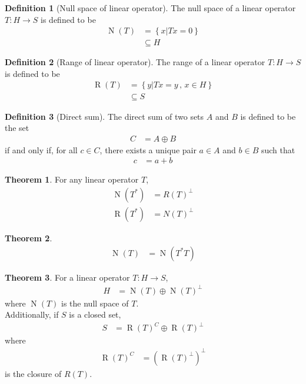 \documentclass[titlepage, fleqn, a4paper, 12pt, twoside]{article}
\theoremstyle{definition}
\newtheorem{definition}{Definition}
\theoremstyle{theorem}
\newtheorem{theorem}{Theorem}
\DeclareMathOperator{\nullspace}{\mathrm{N}}
\DeclareMathOperator{\range}{\mathrm{R}}
\begin{document}
\begin{definition}[Null space of linear operator]
	The null space of a linear operator $T : H \to S$ is defined to be
	\begin{align*}
		\nullspace(T) &= \left\{ x \Big| T x = 0 \right\}\\
		&\subseteq H
	\end{align*}
\end{definition}

\begin{definition}[Range of linear operator]
	The range of a linear operator $T : H \to S$ is defined to be
	\begin{align*}
		\range(T) &= \left\{ y \Big| T x = y \, , \, x \in H \right\}\\
		&\subseteq S
	\end{align*}
\end{definition}

\begin{definition}[Direct sum]
	The direct sum of two sets $A$ and $B$ is defined to be the set
	\begin{align*}
		C &= A \oplus B
	\end{align*}
	if and only if, for all $c \in C$, there exists a unique pair $a \in A$ and $b \in B$ such that
	\begin{align*}
		c &= a + b
	\end{align*}
\end{definition}

\begin{theorem}
	For any linear operator $T$,
	\begin{align*}
		\nullspace\left( T^* \right) &= {R(T)}^{\perp}\\
		\range\left( T^* \right) &= {N(T)}^{\perp}
	\end{align*}
	\label{thm:range_and_nullspace_of_conjugate_transpose_of_transformation}
\end{theorem}

\begin{theorem}
	\begin{align*}
		\nullspace(T) &= \nullspace\left( T^* T \right)
	\end{align*}
\end{theorem}

\begin{theorem}
	For a linear operator $T: H \to S$,
	\begin{align*}
		H &= \nullspace(T) \oplus \nullspace(T)^{\perp}
	\end{align*}
	where $\nullspace(T)$ is the null space of $T$.\\
	Additionally, if $S$ is a closed set,
	\begin{align*}
		S &= \range(T)^{C} \oplus \range(T)^{\perp}
	\end{align*}
	where
	\begin{align*}
		\range(T)^{C} &= \left( \range(T)^{\perp} \right)^{\perp}
	\end{align*}
	is the closure of $R(T)$.
\end{theorem}
\end{document}
